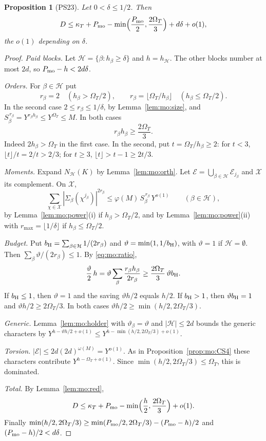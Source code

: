\documentclass{amsart}
\newtheorem{proposition}[lemma]{Proposition}
\theoremstyle{definition}
\theoremstyle{plain}
\numberwithin{equation}{section}
\numberwithin{table}{section}
\begin{document}
\begin{proposition}[PS23]\label{prop:mo:PS23}
Let $0<\delta\le1/2$. Then
\begin{equation}\label{eq:mo:PS23}
 D\le \kappa_T+P_{\rm mo}-\min\Bigl(\frac{P_{\rm mo}}2,\frac{2\Omega_T}3\Bigr)+d\delta+o(1),
\end{equation}
the $o(1)$ depending on $\delta$.
\end{proposition}

\begin{proof}
\emph{Paid blocks.} Let $\mathcal H=\{\beta:h_\beta\ge\delta\}$ and
$h=h_{\mathcal H}$. The other blocks number at most $2d$, so
$P_{\rm mo}-h<2d\delta$.

\emph{Orders.} For $\beta\in\mathcal H$ put
\[
 r_\beta=2\quad(h_\beta>\Omega_T/2),\qquad
 r_\beta=\lfloor\Omega_T/h_\beta\rfloor\quad(h_\beta\le\Omega_T/2).
\]
In the second case $2\le r_\beta\le1/\delta$, by Lemma~\ref{lem:mo:size}, and
$S_\beta^{\,r_\beta}=Y^{r_\beta h_\beta}\le Y^{\Omega_T}\le M$. In both cases
\begin{equation}\label{eq:mo:ratio}
 r_\beta h_\beta\ge\frac{2\Omega_T}3 .
\end{equation}
Indeed $2h_\beta>\Omega_T$ in the first case. In the second, put $t=\Omega_T/h_\beta\ge2$:
for $t<3$, $\lfloor t\rfloor/t=2/t>2/3$; for $t\ge3$,
$\lfloor t\rfloor>t-1\ge2t/3$.

\emph{Moments.} Expand $N_{\mathcal H}(K)$ by Lemma~\ref{lem:mo:orth}. Let
$\mathcal E=\bigcup_{\beta\in\mathcal H}\mathcal E_{j_\beta}$ and $\mathcal X$
its complement. On $\mathcal X$,
\[
 \sum_{\chi\in\mathcal X}|\Sigma_\beta(\chi^{j_\beta})|^{2r_\beta}\le\varphi(M)\,
 S_\beta^{\,r_\beta}\,Y^{o(1)}\qquad(\beta\in\mathcal H),
\]
by Lemma~\ref{lem:mo:power}(i) if $h_\beta>\Omega_T/2$, and by
Lemma~\ref{lem:mo:power}(ii) with $r_{\max}=\lfloor1/\delta\rfloor$ if
$h_\beta\le\Omega_T/2$.

\emph{Budget.} Put $b_{\rm H}=\sum_{\beta\in\mathcal H}1/(2r_\beta)$ and
$\vartheta=\min(1,1/b_{\rm H})$, with $\vartheta=1$ if
$\mathcal H=\emptyset$. Then $\sum_\beta\vartheta/(2r_\beta)\le1$.
By \eqref{eq:mo:ratio},
\[
 \frac\vartheta2\,h=\vartheta\sum_{\beta}\frac{r_\beta h_\beta}{2r_\beta}
 \ge\frac{2\Omega_T}3\,\vartheta b_{\rm H} .
\]
If $b_{\rm H}\le1$, then $\vartheta=1$ and the saving $\vartheta h/2$
equals $h/2$. If $b_{\rm H}>1$, then
$\vartheta b_{\rm H}=1$ and $\vartheta h/2\ge2\Omega_T/3$. In both cases
$\vartheta h/2\ge\min(h/2,2\Omega_T/3)$.

\emph{Generic.} Lemma~\ref{lem:mo:holder} with $\vartheta_\beta=\vartheta$ and
$|\mathcal H|\le2d$ bounds the generic characters by
$Y^{h-\vartheta h/2+o(1)}\le Y^{h-\min(h/2,2\Omega_T/3)+o(1)}$.

\emph{Torsion.} $|\mathcal E|\le2d(2d)^{\omega(M)}=Y^{o(1)}$. As in
Proposition~\ref{prop:mo:CS4} these characters contribute
$Y^{h-\Omega_T+o(1)}$. Since $\min(h/2,2\Omega_T/3)\le\Omega_T$, this is dominated.

\emph{Total.} By Lemma~\ref{lem:mo:red},
\[
 D\le \kappa_T+P_{\rm mo}-\min\Bigl(\frac h2,\frac{2\Omega_T}3\Bigr)+o(1).
\]
Finally $\min(h/2,2\Omega_T/3)\ge\min(P_{\rm mo}/2,2\Omega_T/3)-(P_{\rm mo}-h)/2$
and $(P_{\rm mo}-h)/2<d\delta$.
\end{proof}
\end{document}
